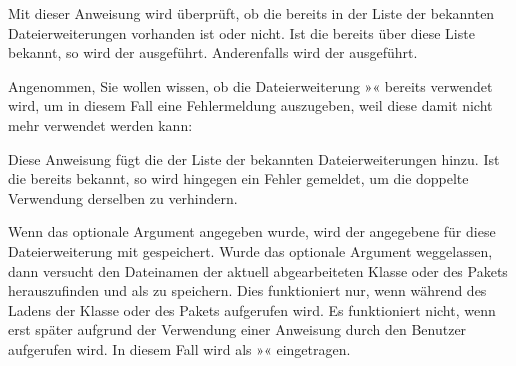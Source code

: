 \begin{Declaration}
\end{Declaration}
Mit dieser Anweisung wird überprüft, ob die  bereits
in der Liste der bekannten Dateierweiterungen vorhanden ist oder nicht. Ist
die  bereits über diese Liste bekannt, so wird der
 ausgeführt. Anderenfalls wird der 
ausgeführt.
\begin{Example}
  Angenommen, Sie wollen wissen, ob die Dateierweiterung »« bereits
  verwendet wird, um in diesem Fall eine Fehlermeldung auszugeben, weil diese
  damit nicht mehr verwendet werden kann:
\begin{lstcode}
\end{lstcode}
\end{Example}
\EndIndexGroup


\begin{Declaration}
\end{Declaration}
Diese Anweisung fügt die  der Liste der bekannten
Dateierweiterungen hinzu. Ist die  bereits bekannt, so
wird hingegen ein Fehler gemeldet, um die doppelte Verwendung derselben
 zu verhindern.

Wenn das optionale Argument  angegeben wurde, wird der
angegebene  für diese Dateierweiterung mit gespeichert. Wurde
das optionale Argument weggelassen, dann versucht  den
Dateinamen der aktuell abgearbeiteten Klasse oder des Pakets herauszufinden
und als  zu speichern. Dies funktioniert
nur, wenn  während des Ladens der Klasse oder des Pakets
aufgerufen wird. Es funktioniert nicht, wenn  erst später
aufgrund der Verwendung einer Anweisung durch den Benutzer aufgerufen wird. In
diesem Fall wird als  »« eingetragen. 

